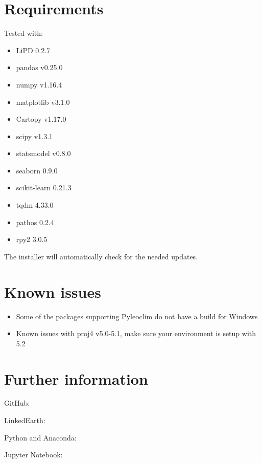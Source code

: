 \documentclass[letterpaper,10pt,english]{sphinxmanual}
\begin{document}
\section{Requirements}
\label{\detokenize{Introduction:requirements}}
Tested with:
\begin{itemize}
\item {} 
LiPD 0.2.7

\item {} 
pandas v0.25.0

\item {} 
numpy v1.16.4

\item {} 
matplotlib v3.1.0

\item {} 
Cartopy v1.17.0

\item {} 
scipy v1.3.1

\item {} 
statsmodel v0.8.0

\item {} 
seaborn 0.9.0

\item {} 
scikit-learn 0.21.3

\item {} 
tqdm 4.33.0

\item {} 
pathos 0.2.4

\item {} 
rpy2 3.0.5

\end{itemize}

The installer will automatically check for the needed updates.


\section{Known issues}
\label{\detokenize{Introduction:known-issues}}\begin{itemize}
\item {} 
Some of the packages supporting Pyleoclim do not have a build for Windows

\item {} 
Known issues with proj4 v5.0-5.1, make sure your environment is setup with 5.2

\end{itemize}


\section{Further information}
\label{\detokenize{Introduction:further-information}}
\begin{DUlineblock}{0em}
\item[] GitHub: 
\item[] LinkedEarth: 
\item[] Python and Anaconda: 
\item[] Jupyter Notebook: 
\end{DUlineblock}
\end{document}
